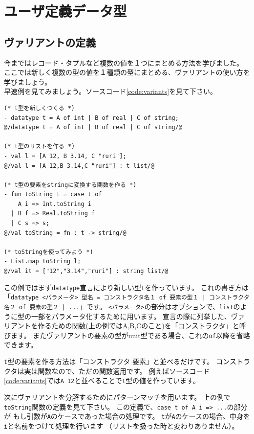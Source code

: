 \documentclass[11pt,a4paper]{article}
\begin{document}
\section{ユーザ定義データ型}
\subsection{ヴァリアントの定義}

今まではレコード・タプルなど複数の値を１つにまとめる方法を学びました。
ここでは新しく複数の型の値を１種類の型にまとめる、ヴァリアントの使い方を学びましょう。\\
早速例を見てみましょう。ソースコード\ref{code:variants}を見て下さい。

\begin{lstlisting}[caption=単純なヴァリアント,label=code:variants]
(* t型を新しくつくる *)
- datatype t = A of int | B of real | C of string;
@/datatype t = A of int | B of real | C of string/@

(* t型のリストを作る *)
- val l = [A 12, B 3.14, C "ruri"];
@/val l = [A 12,B 3.14,C "ruri"] : t list/@

(* t型の要素をstringに変換する関数を作る *)
- fun toString t = case t of
    A i => Int.toString i
  | B f => Real.toString f
  | C s => s;
@/val toString = fn : t -> string/@

(* toStringを使ってみよう *)
- List.map toString l;
@/val it = ["12","3.14","ruri"] : string list/@
\end{lstlisting}

この例ではまず\lstinline{datatype}宣言により新しい型\lstinline{t}を作っています。
これの書き方は「\lstinline{datatype <パラメータ> 型名 = コンストラクタ名１ of 要素の型１ | コンストラクタ名２ of 要素の型２ | ...}」です。
\lstinline{<パラメータ>}の部分はオプションで、\lstinline{list}のように型の一部をパラメータ化するために用います。
宣言の際に列挙した、ヴァリアントを作るための関数(上の例ではA,B,Cのこと)を「コンストラクタ」と呼びます。
またヴァリアントの要素の型がunit型である場合、これの\lstinline{of}以降を省略できます。

\lstinline{t}型の要素を作る方法は「コンストラクタ 要素」と並べるだけです。
コンストラクタは実は関数なので、ただの関数適用です。
例えばソースコード\ref{code:variants}では\lstinline{A 12}と並べることで\lstinline{t}型の値を作っています。

次にヴァリアントを分解するためにパターンマッチを用います。
上の例で\lstinline{toString}関数の定義を見て下さい。
この定義で、\lstinline{case t of A i => ...}の部分が
もし引数が\lstinline{A}のケースであった場合の処理です。
\lstinline{t}が\lstinline{A}のケースの場合、中身を\lstinline{i}と名前をつけて処理を行います
（リストを扱った時と変わりありません）。
\end{document}
